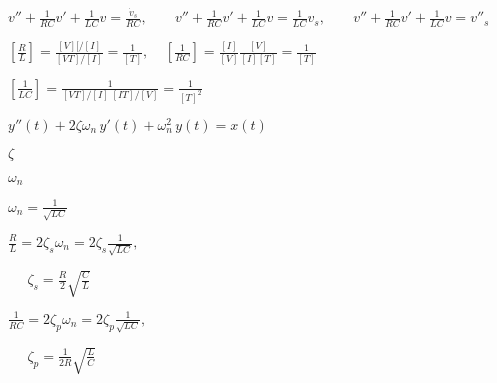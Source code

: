 \documentclass{article}
\def\lthtmlcheckvsize{\ifdim\ht\sizebox<\vsize 
  \ifdim\wd\sizebox<\hsize\expandafter\hfill\fi \expandafter\vfill
  \else\expandafter\vss\fi}%
\begin{document}
{\newpage\clearpage
{}%
$\displaystyle v''+\frac{1}{RC} v'+\frac{1}{LC}v=\frac{\dot{v}_s}{RC},
\;\;\;\;\;\;\;
v''+\frac{1}{RC} v'+\frac{1}{LC}v=\frac{1}{LC}v_s,
\;\;\;\;\;\;\;
v''+\frac{1}{RC} v'+\frac{1}{LC}v=v''_s$%
\lthtmlindisplaymathZ
\lthtmlcheckvsize\clearpage}

{\newpage\clearpage
{}%
$\displaystyle \left[\frac{R}{L}\right]=\frac{[V][/[I]}{[VT]/[I]}=\frac{1}{[T]},
\;\;\;\;
\left[\frac{1}{RC}\right]=\frac{[I]}{[V]}\frac{[V]}{[I][T]}=\frac{1}{[T]}$%
\lthtmlindisplaymathZ
\lthtmlcheckvsize\clearpage}

{\newpage\clearpage
{}%
$\displaystyle \left[\frac{1}{LC}\right]=\frac{1}{[VT]/[I]\;[IT]/[V]}=\frac{1}{[T]^2}$%
\lthtmlindisplaymathZ
\lthtmlcheckvsize\clearpage}

{\newpage\clearpage
{}%
$\displaystyle y''(t)+2\zeta\omega_n\,y'(t)+\omega_n^2\, y(t)= x(t)$%
\lthtmlindisplaymathZ
\lthtmlcheckvsize\clearpage}

{\newpage\clearpage
{}%
$ \zeta$%
\lthtmlindisplaymathZ
\lthtmlcheckvsize\clearpage}

{\newpage\clearpage
{}%
$ \omega_n$%
\lthtmlindisplaymathZ
\lthtmlcheckvsize\clearpage}

{\newpage\clearpage
{}%
$\displaystyle \omega_n=\frac{1}{\sqrt{LC}}$%
\lthtmlindisplaymathZ
\lthtmlcheckvsize\clearpage}

{\newpage\clearpage
{}%
$\displaystyle \frac{R}{L}=2\zeta_s\omega_n=2\zeta_s\frac{1}{\sqrt{LC}},\;\;\;\;$%
\lthtmlindisplaymathZ
\lthtmlcheckvsize\clearpage}

{\newpage\clearpage
{}%
$\displaystyle \;\;\;\;\;
\zeta_s=\frac{R}{2}\sqrt{\frac{C}{L}}$%
\lthtmlindisplaymathZ
\lthtmlcheckvsize\clearpage}

{\newpage\clearpage
{}%
$\displaystyle \frac{1}{RC}=2\zeta_p\omega_n=2\zeta_p\frac{1}{\sqrt{LC}},
\;\;\;\;\;$%
\lthtmlindisplaymathZ
\lthtmlcheckvsize\clearpage}

{\newpage\clearpage
{}%
$\displaystyle \;\;\;\;\;
\zeta_p=\frac{1}{2R}\sqrt{\frac{L}{C}}$%
\lthtmlindisplaymathZ
\lthtmlcheckvsize\clearpage}
\end{document}
